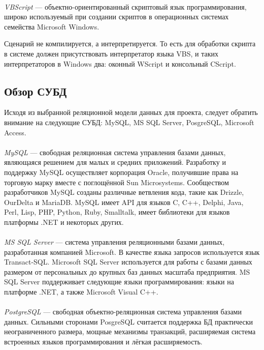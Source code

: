 \paragraph{}
\textit{VBScript} --- объектно-ориентированный скриптовый язык программирования, широко
используемый при создании скриптов в операционных системах семейства Microsoft Windows.

Сценарий не компилируется, а интерпретируется. То есть для обработки скрипта в системе
должен присутствовать интерпретатор языка VBS, и таких интерпретаторов в Windows два:
оконный WScript и консольный CScript.

\subsection{Обзор СУБД}
\label{sub:choice_DBMS}

Исходя из выбранной реляционной модели данных для проекта, следует обратить
внимание на следующие СУБД: MySQL, MS SQL Server, PosgreSQL, Microsoft Access.

\paragraph{}
\textit{MySQL} --- свободная реляционная система управления базами данных, являющаяся
решением для малых и средних приложений.
Разработку и поддержку MySQL осуществляет корпорация Oracle, получившие права на
торговую марку вместе с поглощённой Sun Microsystems.
Сообществом разработчиков MySQL созданы различные ветвления кода, такие как Drizzle,
OurDelta и MariaDB. MySQL имеет API для языков C, C++, Delphi, Java, Perl, Lisp,
PHP, Python, Ruby, Smalltalk, имеет библиотеки для языков платформы .NET и некоторых других.

\paragraph{}
\textit{MS SQL Server} --- система управления реляционными базами данных, разработанная
компанией Microsoft. В качестве языка запросов используется язык Transact-SQL.
Microsoft SQL Server используется для работы с базами данных размером от персональных до
крупных баз данных масштаба предприятия.
MS SQL Server поддерживает следующие языки программирования: языки на платформе .NET, а также
Microsoft Visual C++.

\paragraph{}
\textit{PostgreSQL} --- свободная объектно-реляционная система управления базами
данных. Сильными сторонами PosgreSQL считается поддержка БД практически неограниченного размера,
мощные механизмы транзакций, расширяемая система встроенных языков программирования и
лёгкая расширяемость.

